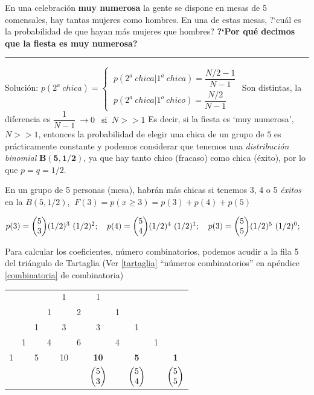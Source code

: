 \begin{ejemplo}
	\begin{ejre}
		En una celebración \textbf{muy numerosa} la gente se dispone en mesas de 5 comensales, hay tantas mujeres como hombres. En una de estas mesas, ?`cuál es la probabilidad de que hayan más mujeres que hombres? \textbf{?`Por qué decimos que la fiesta es muy numerosa?}
	\end{ejre}

\textcolor{gris}{\rule{75mm}{0.1mm}}

Solución:  $p(2^a\ chica)=\begin{cases}
\ p(2^a\ chica|1^a\ chica)=\dfrac{N/2-1}{N-1} \\
\ p(2^a\ chica|1^o\ chico)=\dfrac{N/2}{N-1}
\end{cases}$ Son distintas,
la diferencia es $\dfrac 1{N-1} \ \to 0 \ \ \text{ si } \ N>>1$ Es decir, si la fiesta es `muy numerosa', $N>>1$, entonces la probabilidad de elegir una chica de un grupo de $5$ es prácticamente constante y podemos considerar que tenemos una \emph{distribución binomial} $\boldsymbol{
B(5,1/2)}$, ya que hay tanto chico (fracaso) como chica (éxito), por lo que $p=q=1/2$.

\vspace{2mm} En un grupo de 5 personas (mesa), habrán más chicas si tenemos 3, 4 o 5 \emph{éxitos} en la $B(5,1/2)$, $\ F(3)=p(x\ge 3)=p(3)+p(4)+p(5)$

\vspace{2mm} $ p(3)=\mqty(5\\3)(1/2)^3\ (1/2)^2; \quad p(4)=\mqty(5\\4)(1/2)^4\ (1/2)^1; \quad p(3)=\mqty(5\\5)(1/2)^5\ (1/2)^0; \quad $

\vspace{2mm} Para calcular los coeficientes, número combinatorios, podemos acudir a la fila 5 del triángulo de Tartaglia (Ver \ref{tartaglia} ``números combinatorios'' en apéndice \ref{combinatoria} de combinatoria)

\begin{table}[H]
\centering
\begin{tabular}{ccccccccccc}
 &  &  &  & 1 &  & 1 &  &  &  &  \\
 &  &  & 1 &  & 2 &  & 1 &  &  &  \\
 &  & 1 &  & 3 &  & 3 &  & 1 &  &  \\
 & 1 &  & 4 &  & 6 &  & 4 &  & 1 &  \\
1 &  & 5 &  & 10 &  & \textbf{10} & \textbf{} & \textbf{5} & \textbf{} & \textbf{1} \\
 &  &  &  &  &  & \textcolor{gris}{$\mqty(5\\3)$} &  & \textcolor{gris}{$\mqty(5\\4)$} &  & \textcolor{gris}{$\mqty(5\\5)$}
\end{tabular}
\end{table}


\end{ejemplo}
